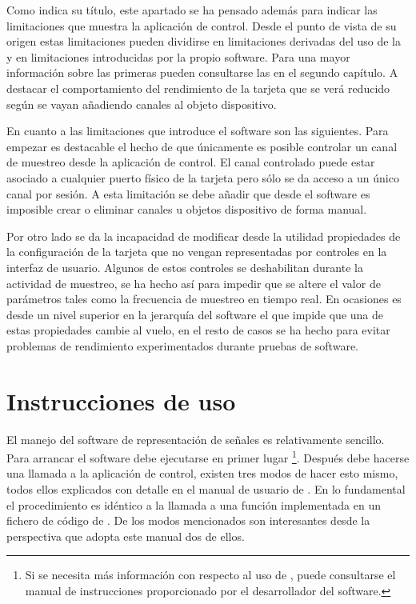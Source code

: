 Como indica su título, este apartado se ha pensado además para indicar las
limitaciones que muestra la aplicación de control. Desde el punto de vista
de su origen estas limitaciones pueden dividirse en limitaciones derivadas
del uso de la \kpci{} y en limitaciones introducidas por la propio
software. Para una mayor información sobre las primeras pueden consultarse
las  en el segundo capítulo. A
destacar el comportamiento del rendimiento de la tarjeta que se verá
reducido según se vayan añadiendo canales al objeto dispositivo.

En cuanto a las limitaciones que introduce el software son las siguientes.
Para empezar es destacable el hecho de que únicamente es posible controlar
un canal de muestreo desde la aplicación de control. El canal controlado
puede estar asociado a cualquier puerto físico de la tarjeta pero sólo se
da acceso a un único canal por sesión. A esta limitación se debe añadir que
desde el software es imposible crear o eliminar canales u objetos
dispositivo de forma manual.

Por otro lado se da la incapacidad de modificar desde la utilidad
propiedades de la configuración de la tarjeta que no vengan representadas
por controles en la interfaz de usuario. Algunos de estos controles se
deshabilitan durante la actividad de muestreo, se ha hecho así para impedir
que se altere el valor de parámetros tales como la frecuencia de muestreo
en tiempo real. En ocasiones es \matlab{} desde un nivel superior en la
jerarquía del software el que impide que una de estas propiedades cambie al
vuelo, en el resto de casos se ha hecho para evitar problemas de
rendimiento experimentados durante pruebas de software.


\section{Instrucciones de uso}

El manejo del software de representación de señales es relativamente
sencillo. Para arrancar el software debe ejecutarse en primer lugar
\matlab{}\footnote{Si se necesita más información con respecto al uso de
\matlab{}, puede consultarse el manual de instrucciones proporcionado por
el desarrollador del software.}. Después debe hacerse una llamada a la
aplicación de control, existen tres modos de hacer esto mismo, todos ellos
explicados con detalle en el manual de usuario de \matlab{}. En lo
fundamental el procedimiento es idéntico a la llamada a una función
implementada en un fichero de código de \matlab{}. De los modos mencionados
son interesantes desde la perspectiva que adopta este manual dos de
ellos.

